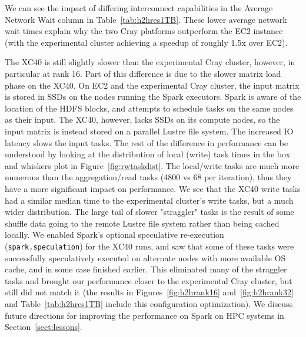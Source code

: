 We can see the impact of differing interconnect capabilities in the Average Network Wait column in Table~\ref{tab:h2hres1TB}.   These lower average network wait times explain why the two Cray platforms outperform the EC2 instance (with the experimental cluster achieving a speedup of roughly 1.5x over EC2).  

The XC40 is still slightly slower than the experimental Cray cluster, however, in particular at rank 16.
Part of this difference is due to the slower matrix load phase on the XC40.  On EC2 and the experimental
Cray cluster, the input matrix is stored in SSDs on the nodes running the Spark executors.  Spark is 
aware of the location of the HDFS blocks, and attempts to schedule tasks on the same nodes as their 
input.  The XC40, however, lacks SSDs on its compute nodes, so the input matrix is instead stored on a 
parallel Lustre file system.  The increased IO latency slows the input tasks. The rest of the difference in 
performance can be understood by looking at the distribution of local (write) task times in the box and 
whiskers plot in Figure~\ref{fig:rwtaskdist}.  The local/write tasks are much more numerous than the 
aggregation/read tasks (4800 vs 68 per iteration), thus they have a more significant impact on 
performance. We see that the XC40 write tasks had a similar median time to the experimental cluster's 
write tasks, but a much wider distribution.  The large tail of slower "straggler" tasks is the result of some shuffle data going to the remote Lustre file system rather than being cached locally. We enabled Spark's optional speculative re-execution (\texttt{spark.speculation}) for the XC40 runs, and saw that some of these tasks were successfully speculatively executed on alternate nodes with more available OS cache, and in some case finished earlier.  This eliminated many of the straggler tasks and brought our performance closer to the experimental Cray cluster, but still did not match it (the results in Figures~\ref{fig:h2hrank16} and~\ref{fig:h2hrank32} and Table~\ref{tab:h2hres1TB} include this configuration optimization).  We discuss future directions for improving the performance on Spark on HPC systems in Section~\ref{sect:lessons}.
